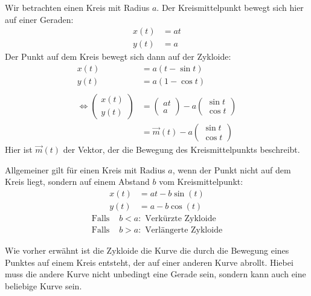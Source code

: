 \documentclass[12pt]{article}
\newcommand{\sameas}{\Longleftrightarrow}
\newenvironment{definition}[2][Definition]{\begin{trivlist}
        \item[\hskip \labelsep {\bfseries #1}\hskip \labelsep {\bfseries #2.}]}{\flushright{$\square$}\end{trivlist}}
\newenvironment{remark}[2][Bemerkung]{\begin{trivlist}
        \item[\hskip \labelsep {\bfseries #1}\hskip \labelsep {\bfseries #2.}]}{\end{trivlist}}
\begin{document}
\begin{definition}{[Zykloide]}
    Wir betrachten einen Kreis mit Radius $a$. Der Kreismittelpunkt bewegt sich
    hier auf einer Geraden:
    \begin{align*}
        x(t) & = at \\
        y(t) & = a
    \end{align*}
    Der Punkt auf dem Kreis bewegt sich dann auf der Zykloide:
    \begin{align*}
        x(t) & = a(t - \sin t)              \\
        y(t) & = a(1 - \cos t)              \\\\
        \sameas \begin{pmatrix}
                    x(t) \\
                    y(t)
                \end{pmatrix}
             & = \begin{pmatrix}
                     at \\
                     a
                 \end{pmatrix}
        - a\begin{pmatrix}
               \sin t \\
               \cos t
           \end{pmatrix}                   \\
             & = \vec{m}(t)-a\begin{pmatrix}
                                 \sin t \\
                                 \cos t
                             \end{pmatrix}
    \end{align*}
    Hier ist $\vec{m}(t)$ der Vektor, der die Bewegung des Kreismittelpunkts beschreibt.

    Allgemeiner gilt für einen Kreis mit Radius $a$, wenn der Punkt nicht auf dem
    Kreis liegt, sondern auf einem Abstand $b$ vom Kreismittelpunkt:
    \begin{align*}
        x(t) & = at - b\sin(t) \\
        y(t) & = a - b\cos(t)
    \end{align*}
    \begin{align*}
        \text{Falls } & b<a: \text{ Verkürzte Zykloide}   \\
        \text{Falls } & b>a: \text{ Verlängerte Zykloide}
    \end{align*}

    \begin{remark}{[Mehr als Geraden]}
        Wie vorher erwähnt ist die Zykloide die Kurve die durch die Bewegung eines Punktes auf einem Kreis entsteht, der auf einer anderen Kurve abrollt. Hiebei muss die andere Kurve nicht unbedingt eine Gerade sein, sondern kann auch eine beliebige Kurve sein.
    \end{remark}
\end{definition}
\end{document}
